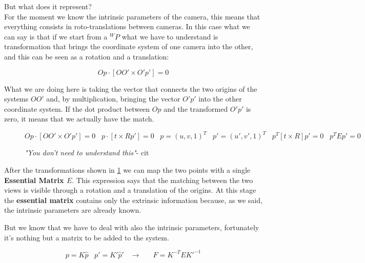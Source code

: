 But what does it represent? \\
For the moment we know the intrinsic parameters of the camera, this means that everything consists in roto-translations between cameras. In this case what we can say is that if we start from a \({}^WP\) what we have to understand is transformation that brings the coordinate system of one camera into the other, and this can be seen as a rotation and a translation:

\[
    Op\cdot[OO'\times O'p'] = 0
\]

What we are doing here is taking the vector that connects the two origins of the systems \(OO'\) and, by multiplication, bringing the vector \(O'p'\) into the other coordinate system. If the dot product between \(Op\) and the transformed \(O'p'\) is zero, it means that we actually have the match.

\begin{figure}[H]
\[
    Op\cdot[OO'\times O'p'] = 0 \;\;\;
    p\cdot[t\times Rp'] = 0 \;\;\;
    p = (u,v,1)^T \;\;\;
    p' = (u',v',1)^T \;\;\;
    p^T[t\times R]p'=0 \;\;\;
    p^TEp'=0    
\]
\caption{\textit{"You don't need to understand this"}- cit}
\label{eq:ess}
\end{figure}

After the transformations shown in \ref{eq:ess} we can map the two points with a single \textbf{Essential Matrix \(E\)}. This expression says that the matching between the two views is visible through a rotation and a translation of the origins. At this stage the \textbf{essential matrix} contains only the extrinsic information because, as we said, the intrinsic parameters are already known.

But we know that we have to deal with also the intrinsic parameters, fortunately it's nothing but a matrix to be added to the system.

\[
    p = K\hat{p} \;\;\;
    p' = K'\hat{p}' \;\;\;
    \rightarrow \;\;\;\;\;\; 
    F= K^{-T}EK'^{-1}
\]

